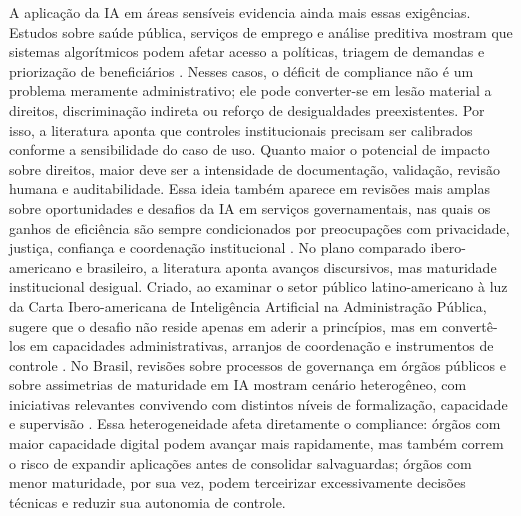 \documentclass[12pt,a4paper]{article}
\begin{document}
A aplicação da IA em áreas sensíveis evidencia ainda mais essas exigências. Estudos sobre saúde pública, serviços de emprego e análise preditiva mostram que sistemas algorítmicos podem afetar acesso a políticas, triagem de demandas e priorização de beneficiários \autocite{lemes2020o} \autocite{krtner2021predictive}. Nesses casos, o déficit de compliance não é um problema meramente administrativo; ele pode converter-se em lesão material a direitos, discriminação indireta ou reforço de desigualdades preexistentes. Por isso, a literatura aponta que controles institucionais precisam ser calibrados conforme a sensibilidade do caso de uso. Quanto maior o potencial de impacto sobre direitos, maior deve ser a intensidade de documentação, validação, revisão humana e auditabilidade. Essa ideia também aparece em revisões mais amplas sobre oportunidades e desafios da IA em serviços governamentais, nas quais os ganhos de eficiência são sempre condicionados por preocupações com privacidade, justiça, confiança e coordenação institucional \autocite{alhosani2024opportunities} \autocite{pi2021machine}.
No plano comparado ibero-americano e brasileiro, a literatura aponta avanços discursivos, mas maturidade institucional desigual. Criado, ao examinar o setor público latino-americano à luz da Carta Ibero-americana de Inteligência Artificial na Administração Pública, sugere que o desafio não reside apenas em aderir a princípios, mas em convertê-los em capacidades administrativas, arranjos de coordenação e instrumentos de controle \autocite{criado2024inteligencia}. No Brasil, revisões sobre processos de governança em órgãos públicos e sobre assimetrias de maturidade em IA mostram cenário heterogêneo, com iniciativas relevantes convivendo com distintos níveis de formalização, capacidade e supervisão \autocite{goulart2025processos} \autocite{mariano2026inteligencia}. Essa heterogeneidade afeta diretamente o compliance: órgãos com maior capacidade digital podem avançar mais rapidamente, mas também correm o risco de expandir aplicações antes de consolidar salvaguardas; órgãos com menor maturidade, por sua vez, podem terceirizar excessivamente decisões técnicas e reduzir sua autonomia de controle.
\end{document}

